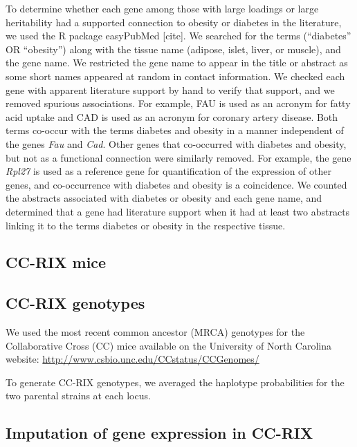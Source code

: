 \documentclass[
]{article}
\begin{document}
To determine whether each gene among those with large loadings or large
heritability had a supported connection to obesity or diabetes in the
literature, we used the R package easyPubMed {[}cite{]}. We searched for
the terms (``diabetes'' OR ``obesity'') along with the tissue name
(adipose, islet, liver, or muscle), and the gene name. We restricted the
gene name to appear in the title or abstract as some short names
appeared at random in contact information. We checked each gene with
apparent literature support by hand to verify that support, and we
removed spurious associations. For example, FAU is used as an acronym
for fatty acid uptake and CAD is used as an acronym for coronary artery
disease. Both terms co-occur with the terms diabetes and obesity in a
manner independent of the genes \textit{Fau} and \textit{Cad}. Other
genes that co-occurred with diabetes and obesity, but not as a
functional connection were similarly removed. For example, the gene
\textit{Rpl27} is used as a reference gene for quantification of the
expression of other genes, and co-occurrence with diabetes and obesity
is a coincidence. We counted the abstracts associated with diabetes or
obesity and each gene name, and determined that a gene had literature
support when it had at least two abstracts linking it to the terms
diabetes or obesity in the respective tissue.

\subsection{CC-RIX mice}\label{cc-rix-mice}

\subsection{CC-RIX genotypes}\label{cc-rix-genotypes}

We used the most recent common ancestor (MRCA) genotypes for the
Collaborative Cross (CC) mice available on the University of North
Carolina website: \url{http://www.csbio.unc.edu/CCstatus/CCGenomes/}

To generate CC-RIX genotypes, we averaged the haplotype probabilities
for the two parental strains at each locus.

\subsection{Imputation of gene expression in
CC-RIX}\label{imputation-of-gene-expression-in-cc-rix}
\end{document}
